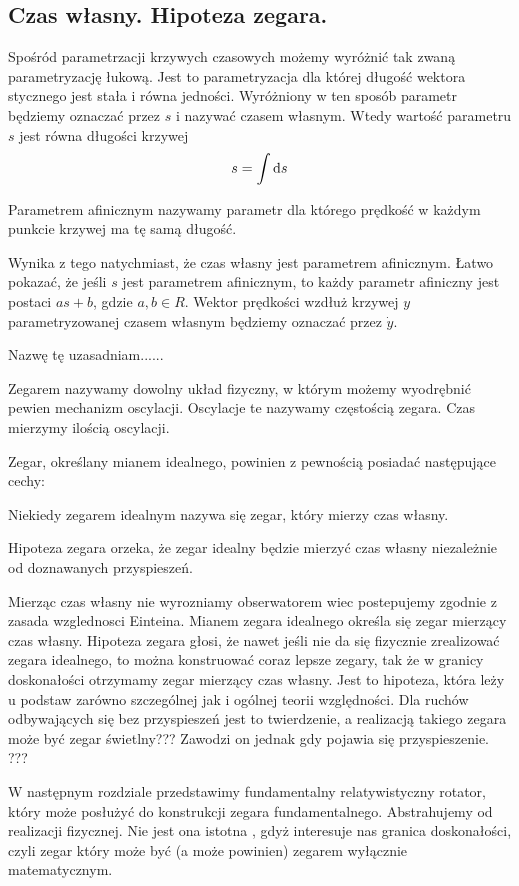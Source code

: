 \subsection{Czas własny. Hipoteza zegara.}
Spośród parametrzacji krzywych czasowych
 możemy wyróżnić tak zwaną parametryzację łukową.
Jest to parametryzacja dla której długość 
wektora stycznego jest stała i równa jedności.
Wyróżniony w ten sposób parametr będziemy oznaczać przez 
$s$ i nazywać czasem własnym.
Wtedy wartość parametru $s$ jest równa długości krzywej
\begin{align}
s = \int \text{d} s
\end{align}
\begin{definition}
Parametrem afinicznym nazywamy parametr dla którego 
prędkość w każdym punkcie krzywej ma tę samą długość.
\end{definition}
Wynika z tego natychmiast, że czas własny jest parametrem afinicznym.
Łatwo pokazać, że jeśli $s$ jest 
parametrem afinicznym, to każdy parametr afiniczny 
jest postaci $a s+b$, gdzie $a,b\in R$.
Wektor prędkości wzdłuż krzywej $y$ parametryzowanej czasem 
własnym będziemy oznaczać przez $\dot{y}$.



Nazwę tę uzasadniam......


\begin{definition}
Zegarem nazywamy dowolny układ fizyczny, w którym możemy wyodrębnić pewien
mechanizm oscylacji. Oscylacje te nazywamy częstością zegara. Czas mierzymy
ilością oscylacji.
\end{definition}
Zegar, określany mianem idealnego, powinien z pewnością posiadać następujące 
cechy:

Niekiedy zegarem idealnym nazywa się zegar, który mierzy czas własny.

Hipoteza zegara orzeka, że zegar idealny będzie mierzyć 
czas własny niezależnie od doznawanych przyspieszeń. 



Mierząc czas własny nie wyrozniamy obserwatorem wiec 
postepujemy zgodnie z zasada wzglednosci Einteina. 
Mianem zegara idealnego określa się zegar mierzący czas własny. 
Hipoteza zegara głosi, że nawet jeśli nie da się fizycznie zrealizować 
zegara idealnego, to można konstruować coraz lepsze zegary, 
tak że w granicy doskonałości otrzymamy zegar mierzący czas własny. 
Jest to hipoteza, która leży u podstaw zarówno 
szczególnej jak i ogólnej teorii względności. 
Dla ruchów odbywających się bez przyspieszeń jest to twierdzenie, a 
realizacją takiego zegara może być zegar świetlny??? 
Zawodzi on jednak gdy pojawia się przyspieszenie. ???

W następnym rozdziale przedstawimy fundamentalny 
relatywistyczny rotator, który może posłużyć do konstrukcji zegara 
fundamentalnego. Abstrahujemy od realizacji fizycznej. 
Nie jest ona istotna , gdyż interesuje nas granica doskonałości, 
czyli zegar który może być (a może powinien) 
zegarem wyłącznie matematycznym.  
